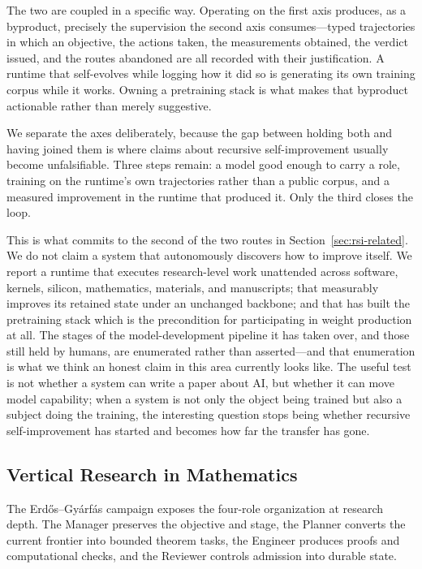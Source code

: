 The two are coupled in a specific way. Operating on the first axis produces, as a
byproduct, precisely the supervision the second axis consumes---typed trajectories
in which an objective, the actions taken, the measurements obtained, the verdict
issued, and the routes abandoned are all recorded with their justification. A
runtime that self-evolves while logging how it did so is generating its own training
corpus while it works. Owning a pretraining stack is what makes that byproduct
actionable rather than merely suggestive.

We separate the axes deliberately, because the gap between holding both and having
joined them is where claims about recursive self-improvement usually become
unfalsifiable. Three steps remain: a model good enough to carry a role, training on
the runtime's own trajectories rather than a public corpus, and a measured
improvement in the runtime that produced it. Only the third closes the loop.

This is what commits \systemname{} to the second of the two routes in
Section~\ref{sec:rsi-related}. We do not claim a system that autonomously discovers
how to improve itself. We report a runtime that executes research-level work
unattended across software, kernels, silicon, mathematics, materials, and
manuscripts; that measurably improves its retained state under an unchanged backbone;
and that has built the pretraining stack which is the precondition for participating
in weight production at all. The stages of the model-development pipeline it has
taken over, and those still held by humans, are enumerated rather than asserted---and
that enumeration is what we think an honest claim in this area currently looks like.
The useful test is not whether a system can write a paper about AI, but whether it
can move model capability; when a system is not only the object being trained but
also a subject doing the training, the interesting question stops being whether
recursive self-improvement has started and becomes how far the transfer has gone.

\subsection{Vertical Research in Mathematics}

The Erd\H{o}s--Gy\'arf\'as campaign exposes the four-role organization at research
depth. The Manager preserves the objective and stage, the Planner converts the
current frontier into bounded theorem tasks, the Engineer produces proofs and
computational checks, and the Reviewer controls admission into durable state.

